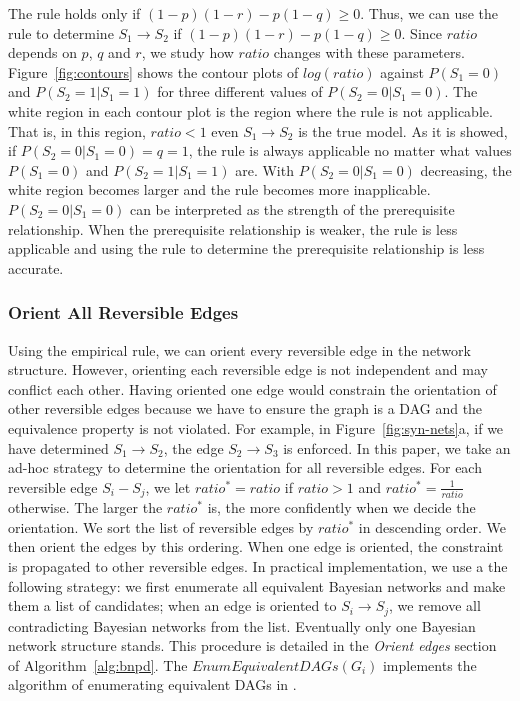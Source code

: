 \documentclass{edm_template}
\begin{document}
The rule holds only if $(1-p)(1-r)-p(1-q)\ge 0$. Thus, we can use the rule to determine $S_1\rightarrow S_2$ if $(1-p)(1-r)-p(1-q)\ge 0$.
Since $ratio$ depends on $p$, $q$ and $r$, we study how $ratio$ changes with these parameters.
Figure~\ref{fig:contours} shows the contour plots of $log(ratio)$ against $P(S_1=0)$ and $P(S_2=1|S_1=1)$ for three different values of $P(S_2=0|S_1=0)$.
The white region in each contour plot is the region where the rule is not applicable. 
That is, in this region, $ratio<1$ even $S_1\rightarrow S_2$ is the true model.
As it is showed, if $P(S_2=0|S_1=0)=q=1$, 
the rule is always applicable no matter what values $P(S_1=0)$ and $P(S_2=1|S_1=1)$ are.
With $P(S_2=0|S_1=0)$ decreasing, the white region becomes larger and the rule becomes more inapplicable.
$P(S_2=0|S_1=0)$ can be interpreted as the strength of the prerequisite relationship. When the prerequisite relationship is weaker, the rule is less applicable 
and using the rule to determine the prerequisite relationship is less accurate.

\subsubsection{Orient All Reversible Edges}
Using the empirical rule, we can orient every reversible edge in the network structure. 
However, orienting each reversible edge is not independent and may conflict each other.
Having oriented one edge would constrain the orientation of other reversible edges because we have to ensure the graph is a DAG and the equivalence property is not violated.
For example, in Figure~\ref{fig:syn-nets}a, if we have determined $S_1\rightarrow S_2$, the edge $S_2\rightarrow S_3$ is enforced.
In this paper, we take an ad-hoc strategy to determine the orientation for all reversible edges. 
For each reversible edge $S_i-S_j$, we let $ratio^*=ratio$ if $ratio >1$ and $ratio^*=\frac{1}{ratio}$ otherwise. 
The larger the $ratio^*$ is, the more confidently when we decide the orientation.
We sort the list of reversible edges by $ratio^*$ in descending order. We then orient the edges by this ordering.
When one edge is oriented, the constraint is propagated to other reversible edges. In practical implementation, we use a the following strategy: 
we first enumerate all equivalent Bayesian networks and make them a list of candidates; 
when an edge is oriented to $S_i\rightarrow S_j$, we remove all contradicting Bayesian networks from the list.
Eventually only one Bayesian network structure stands. This procedure is detailed in the \emph{Orient edges} section of Algorithm~\ref{alg:bnpd}.  
The $EnumEquivalentDAGs(G_i)$ implements the algorithm of enumerating equivalent DAGs in \cite{chen2014finding}.
\end{document}
